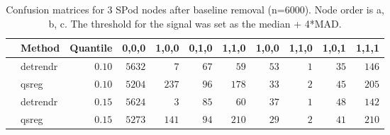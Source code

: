 \begin{table}[!tbp]
\caption{Confusion matrices for 3 SPod nodes after baseline 
      removal (n=6000). Node order is a, b, c. The threshold for the signal was 
      set as the median + 4*MAD.\label{confusion}} 
\begin{center}
\begin{tabular}{llrrrrrrrrr}
\hline\hline
\multicolumn{1}{l}{}&\multicolumn{1}{c}{Method}&\multicolumn{1}{c}{Quantile}&\multicolumn{1}{c}{0,0,0}&\multicolumn{1}{c}{1,0,0}&\multicolumn{1}{c}{0,1,0}&\multicolumn{1}{c}{1,1,0}&\multicolumn{1}{c}{1,0,0}&\multicolumn{1}{c}{1,1,0}&\multicolumn{1}{c}{1,0,1}&\multicolumn{1}{c}{1,1,1}\tabularnewline
\hline
&detrendr&$0.10$&$5632$&$  7$&$67$&$ 59$&$53$&$1$&$35$&$146$\tabularnewline
&qsreg&$0.10$&$5204$&$237$&$96$&$178$&$33$&$2$&$45$&$205$\tabularnewline
&detrendr&$0.15$&$5624$&$  3$&$85$&$ 60$&$37$&$1$&$48$&$142$\tabularnewline
&qsreg&$0.15$&$5273$&$141$&$94$&$210$&$29$&$2$&$41$&$210$\tabularnewline
\hline
\end{tabular}\end{center}
\end{table}
